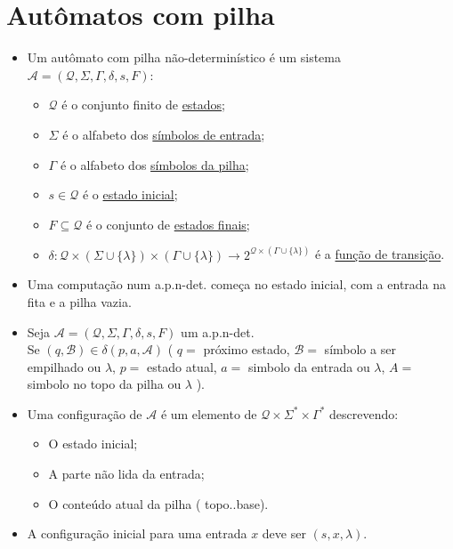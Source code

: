 \documentclass{article}
\begin{document}
\section{Autômatos com pilha}
    \begin{itemize}
        \item Um autômato com pilha não-determinístico é um sistema
                $\mathcal{A} = ( \mathcal{Q}, \Sigma, \Gamma, \delta, s, F ) $:
                \begin{itemize}
                    \item $\mathcal{Q}$ é o conjunto finito de \underline{estados};
                    \item $\Sigma$ é o alfabeto dos \underline{símbolos de entrada};
                    \item $\Gamma$ é o alfabeto dos \underline{símbolos da pilha};
                    \item $ s \in \mathcal{Q} $ é o \underline{estado inicial};
                    \item $ F \subseteq \mathcal{Q} $ é o conjunto de \underline{estados finais};
                    \item $ \delta : \mathcal{Q} \times ( \Sigma \cup \{\lambda\} ) \times ( \Gamma \cup \{\lambda\} ) 
                            \longrightarrow 2^{\mathcal{Q} \times ( \Gamma \cup \{\lambda\} ) } $ é a 
                            \underline{função de transição}.
                \end{itemize}
    \item Uma computação num a.p.n-det. começa no estado inicial, com a entrada na fita e a pilha vazia.
    \item Seja $ \mathcal{A} = ( \mathcal{Q}, \Sigma, \Gamma, \delta, s, F ) $ um a.p.n-det.\\
            Se $(q, \mathcal{B} ) \in \delta(p,a,\mathcal{A}) $ 
            ( $q =$ próximo estado, $\mathcal{B} =$ símbolo a ser empilhado ou $\lambda$,
              $p =$ estado atual, $a =$ simbolo da entrada ou $\lambda$, $A =$ simbolo no topo da pilha ou $\lambda$ ).
    \item Uma configuração de $\mathcal{A}$ é um elemento de $ \mathcal{Q} \times \Sigma^* \times \Gamma^* $ descrevendo:
        \begin{itemize}
            \item O estado inicial;
            \item A parte não lida da entrada;
            \item O conteúdo atual da pilha ( topo..base).
        \end{itemize}
    \item A configuração inicial para uma entrada $x$ deve ser $(s,x,\lambda)$.
    \end{itemize}
    
\end{document}
